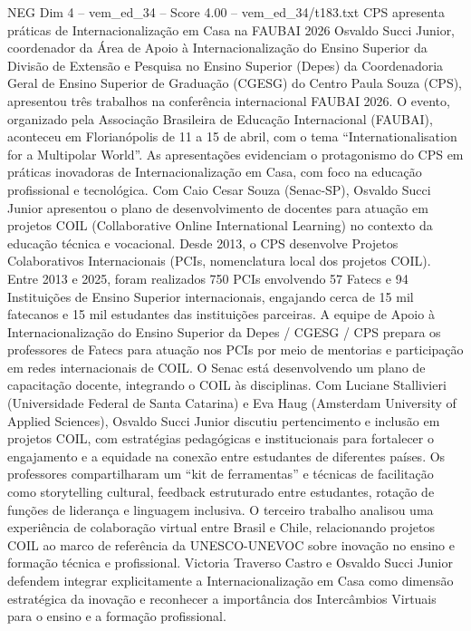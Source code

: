 \begin{textsample}{NEG Dim 4 – vem\_ed\_34 – Score 4.00 – vem\_ed\_34/t183.txt}  \label{ex:f4_neg_107}
CPS apresenta práticas de Internacionalização em Casa na FAUBAI 2026 Osvaldo Succi Junior, coordenador da Área de Apoio à Internacionalização do Ensino Superior da Divisão de Extensão e Pesquisa no Ensino Superior (Depes) da Coordenadoria Geral de Ensino Superior de Graduação (CGESG) do Centro Paula Souza (CPS), apresentou três trabalhos na conferência internacional FAUBAI 2026.
O evento, organizado pela Associação Brasileira de Educação Internacional (FAUBAI), aconteceu em Florianópolis de 11 a 15 de abril, com o tema “Internationalisation for a Multipolar World”.
As apresentações evidenciam o protagonismo do CPS em práticas inovadoras de Internacionalização em Casa, com foco na educação profissional e tecnológica.
Com Caio Cesar Souza (Senac-SP), Osvaldo Succi Junior apresentou o plano de desenvolvimento de docentes para atuação em projetos COIL (Collaborative Online International Learning) no contexto da educação técnica e vocacional.
Desde 2013, o CPS desenvolve Projetos Colaborativos Internacionais (PCIs, nomenclatura local dos projetos COIL).
Entre 2013 e 2025, foram realizados 750 PCIs envolvendo 57 Fatecs e 94 Instituições de Ensino Superior internacionais, engajando cerca de 15 mil fatecanos e 15 mil estudantes das instituições parceiras.
A equipe de Apoio à Internacionalização do Ensino Superior da Depes / CGESG / CPS prepara os professores de Fatecs para atuação nos PCIs por meio de mentorias e participação em redes internacionais de COIL.
O Senac está desenvolvendo um plano de capacitação docente, integrando o COIL às disciplinas.
Com Luciane Stallivieri (Universidade Federal de Santa Catarina) e Eva Haug (Amsterdam University of Applied Sciences), Osvaldo Succi Junior discutiu pertencimento e inclusão em projetos COIL, com estratégias pedagógicas e institucionais para fortalecer o engajamento e a equidade na conexão entre estudantes de diferentes países.
Os professores compartilharam um “kit de ferramentas” e técnicas de facilitação como storytelling cultural, feedback estruturado entre estudantes, rotação de funções de liderança e linguagem inclusiva.
O terceiro trabalho analisou uma experiência de colaboração virtual entre Brasil e Chile, relacionando projetos COIL ao marco de referência da UNESCO-UNEVOC sobre inovação no ensino e formação técnica e profissional.
Victoria Traverso Castro e Osvaldo Succi Junior defendem integrar explicitamente a Internacionalização em Casa como dimensão estratégica da inovação e reconhecer a importância dos Intercâmbios Virtuais para o ensino e a formação profissional.

\end{textsample}
